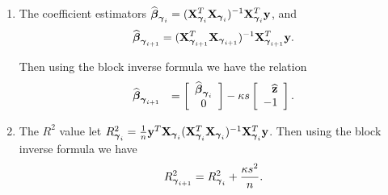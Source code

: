 \begin{enumerate}
	\item
	The coefficient estimators 
	$ 
	\displaystyle \widehat{{\boldsymbol \beta}}_{{\boldsymbol \gamma}_{i}} = ({\bf X}_{{\boldsymbol \gamma}_{i}}^T{\bf X}_{{\boldsymbol \gamma}_{i}})^{-1}{\bf X}_{{\boldsymbol \gamma}_{i}}^T{\bf y}$,
	and 
	$$
	\displaystyle \widehat{{\boldsymbol \beta}}_{{\boldsymbol \gamma}_{i+1}}  = ({\bf X}_{{\boldsymbol \gamma}_{i+1}}^T{\bf X}_{{\boldsymbol \gamma}_{i+1}})^{-1}{\bf X}_{{\boldsymbol \gamma}_{i+1}}^T{\bf y}.
	$$
	
	\noindent   
	Then using the block inverse formula we have
	the relation
	$$
	\begin{array}{rl}
	\displaystyle \widehat{{\boldsymbol \beta}}_{{\boldsymbol \gamma}_{i+1}}
	& \displaystyle 
	= \left[ \begin{array}{c}
	\widehat{{\boldsymbol \beta}}_{{\boldsymbol \gamma}_{i}} \\
	0 
	\end{array} \right] - \kappa s  \left[ \begin{array}{r}
	\widehat{{\bf z}}   \\
	- 1
	\end{array} \right].
	\end{array} 
	$$
	
	\item The $R^2$ value let 
	$R_{\vgamma_{i}}^2 = \tfrac{1}{n} \vy^T\mX_{\vgamma_{i}}(\mX_{\vgamma_{i}}^T\mX_{\vgamma_{i}})^{-1}\mX_{\vgamma_{i}}^T\vy$.
	Then using the block inverse formula we have
	$$
	\begin{array}{rl}
	\ds 
	R_{\vgamma_{i+1}}^2 
	= R_{\vgamma_{i}}^2
	+ \frac{\kappa s^2}{n}.
	
	\end{array}
	$$
	
\end{enumerate}

